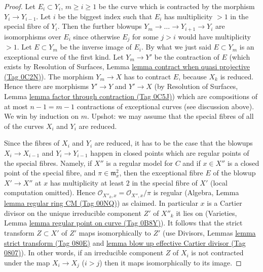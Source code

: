 \documentclass{amsart}
\theoremstyle{plain}
\theoremstyle{definition}
\theoremstyle{remark}
\numberwithin{equation}{subsection}
\begin{document}
\begin{proof}
\medskip\noindent
Let $E_i \subset Y_i$, $m \geq i \geq 1$ be the curve which is contracted
by the morphism $Y_i \to Y_{i - 1}$. Let $i$ be the biggest index such
that $E_i$ has multiplicity $> 1$ in the special fibre of $Y_i$.
Then the further blowups $Y_m \to \ldots \to Y_{i + 1} \to Y_i$
are isomorphisms over $E_i$ since otherwise $E_j$ for some $j > i$
would have multiplicity $> 1$. Let $E \subset Y_m$ be the inverse
image of $E_i$. By what we just said $E \subset Y_m$ is an
exceptional curve of the first kind. Let $Y_m \to Y'$ be the
contraction of $E$ (which exists by Resolution of Surfaces, Lemma
\href{https://stacks.math.columbia.edu/tag/0C2N}{lemma contract when quasi projective (Tag 0C2N)}). The morphism
$Y_m \to X$ has to contract $E$, because $X_k$ is reduced.
Hence there are morphisms $Y' \to Y$ and $Y' \to X$ (by
Resolution of Surfaces, Lemma
\href{https://stacks.math.columbia.edu/tag/0C5J}{lemma factor through contraction (Tag 0C5J)})
which are compositions of at most $n - 1 = m - 1$ contractions
of exceptional curves (see discussion above). We win by induction on $m$.
Upshot: we may assume that the special fibres of all of
the curves $X_i$ and $Y_i$ are reduced.

\medskip\noindent
Since the fibres of $X_i$ and $Y_i$ are reduced, it has to be the
case that the blowups $X_i \to X_{i - 1}$ and $Y_i \to Y_{i - 1}$
happen in closed points which are regular points of the special fibres.
Namely, if $X''$ is a regular model for $C$ and if $x \in X''$
is a closed point of the special fibre, and
$\pi \in \mathfrak m_x^2$, then the exceptional fibre $E$ of the
blowup $X' \to X''$ at $x$ has multiplicity at least $2$ in the
special fibre of $X'$ (local computation omitted).
Hence $\mathcal{O}_{X''_k, x} = \mathcal{O}_{X'', x}/\pi$ is
regular (Algebra, Lemma \href{https://stacks.math.columbia.edu/tag/00NQ}{lemma regular ring CM (Tag 00NQ)}) as claimed.
In particular $x$ is a Cartier divisor on the unique
irreducible component $Z'$ of $X''_k$ it lies on
(Varieties, Lemma \href{https://stacks.math.columbia.edu/tag/0B8Y}{lemma regular point on curve (Tag 0B8Y)}).
It follows that the strict transform $Z \subset X'$ of $Z'$
maps isomorphically to $Z'$
(use Divisors, Lemmas \href{https://stacks.math.columbia.edu/tag/080E}{lemma strict transform (Tag 080E)} and
\href{https://stacks.math.columbia.edu/tag/0807}{lemma blow up effective Cartier divisor (Tag 0807)}).
In other words, if an irreducible component $Z$ of $X_i$
is not contracted under the map $X_i \to X_j$ ($i > j$)
then it maps isomorphically to its image.


\end{proof}
\end{document}
